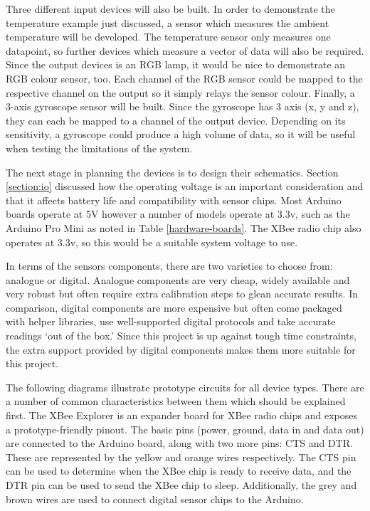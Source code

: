         Three different input devices will also be built. In order to demonstrate the temperature example just discussed, a sensor which measures the ambient temperature will be developed. The temperature sensor only measures one datapoint, so further devices which measure a vector of data will also be required. Since the output devices is an RGB lamp, it would be nice to demonstrate an RGB colour sensor, too. Each channel of the RGB sensor could be mapped to the respective channel on the output so it simply relays the sensor colour. Finally, a 3-axis gyroscope sensor will be built. Since the gyroscope has 3 axis (x, y and z), they can each be mapped to a channel of the output device. Depending on its sensitivity, a gyroscope could produce a high volume of data, so it will be useful when testing the limitations of the system.

        The next stage in planning the devices is to design their schematics. Section \ref{section:io} discussed how the operating voltage is an important consideration and that it affects battery life and compatibility with sensor chips. Most Arduino boards operate at 5V however a number of models operate at 3.3v, such as the Arduino Pro Mini as noted in Table \ref{hardware-boards}. The XBee radio chip also operates at 3.3v, so this would be a suitable system voltage to use.

        In terms of the sensors components, there are two varieties to choose from: analogue or digital. Analogue components are very cheap, widely available and very robust but often require extra calibration steps to glean accurate results. In comparison, digital components are more expensive but often come packaged with helper libraries, use well-supported digital protocols and take accurate readings `out of the box.' Since this project is up against tough time constraints, the extra support provided by digital components makes them more suitable for this project.

        The following diagrams illustrate prototype circuits for all device types. There are a number of common characteristics between them which should be explained first. The XBee Explorer is an expander board for XBee radio chips and exposes a prototype-friendly pinout. The basic pins (power, ground, data in and data out) are connected to the Arduino board, along with two more pins: CTS and DTR. These are represented by the yellow and orange wires respectively. The CTS pin can be used to determine when the XBee chip is ready to receive data, and the DTR pin can be used to send the XBee chip to sleep. Additionally, the grey and brown wires are used to connect digital sensor chips to the Arduino.

